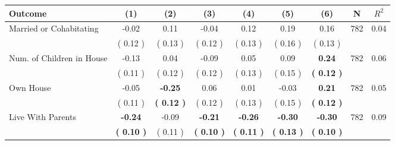 \begin{tabular}{lcccccccc}
\toprule
 \textbf{Outcome} & \textbf{(1)} & \textbf{(2)} & \textbf{(3)} & \textbf{(4)} & \textbf{(5)} & \textbf{(6)} & \textbf{N} & \textbf{$ R^2$} \\
\midrule
Married or Cohabitating &     -0.02 &      0.11 &     -0.04 &      0.12 &      0.19 &      0.16 & 782 &       0.04 \\ 
 & (     0.12 ) & (     0.13 ) & (     0.12 ) & (     0.13 ) & (     0.16 ) & (     0.13 ) & \\
Num. of Children in House &     -0.13 &      0.04 &     -0.09 &      0.05 &      0.09 & \textbf{     0.24} & 782 &       0.06 \\ 
 & (     0.11 ) & (     0.12 ) & (     0.12 ) & (     0.13 ) & (     0.15 ) & \textbf{(     0.12 )} & \\
Own House &     -0.05 & \textbf{    -0.25} &      0.06 &      0.01 &     -0.03 & \textbf{     0.21} & 782 &       0.05 \\ 
 & (     0.11 ) & \textbf{(     0.12 )} & (     0.12 ) & (     0.13 ) & (     0.15 ) & \textbf{(     0.12 )} & \\
Live With Parents & \textbf{    -0.24} &     -0.09 & \textbf{    -0.21} & \textbf{    -0.26} & \textbf{    -0.30} & \textbf{    -0.30} & 782 &       0.09 \\ 
 & \textbf{(     0.10 )} & (     0.11 ) & \textbf{(     0.10 )} & \textbf{(     0.11 )} & \textbf{(     0.13 )} & \textbf{(     0.10 )} & \\
\bottomrule
\end{tabular}
